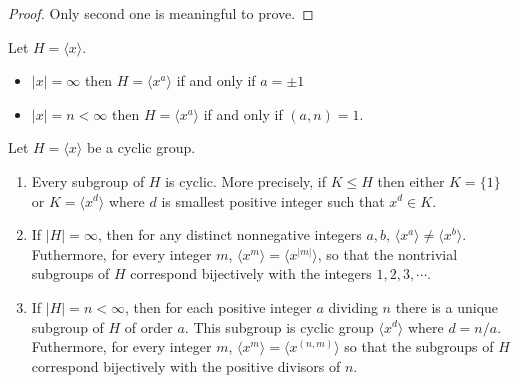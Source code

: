 \documentclass[12pt, a4paper, openany, twoside]{book}
\theoremstyle{definition}
\theoremstyle{remark}
\theoremstyle{plain}
\numberwithin{equation}{section}
\begin{document}
\begin{proof}
    
Only second one is meaningful to prove. 

\end{proof}

\begin{tcolorbox}[colback=yellow!10!white,colframe=green!75!black,title=Proposition]

Let $H = \langle x \rangle$. 
\begin{itemize}
    \item $|x| = \infty$ then $H = \langle x^a \rangle$ if and only if $a = \pm 1$
    \item $|x| = n < \infty$ then $H  = \langle x^a \rangle$ if and only if $(a, n) = 1$. 
\end{itemize}

\end{tcolorbox}

\begin{tcolorbox}[colback=yellow!10!white,colframe=red!75!black,title=Theorem]

Let $H = \langle x \rangle$ be a cyclic group. 

\begin{enumerate}
    \item Every subgroup of $H$ is cyclic. More precisely, if $K \leq H$ then either $K = \{1\}$ or $K = \langle x^d \rangle$ where $d$ is smallest positive integer such that $x^d \in K$. 
    \item If $|H| = \infty$, then for any distinct nonnegative integers $a, b$, $\langle x^a \rangle \neq \langle x^b \rangle$. Futhermore, for every integer $m$, $\langle x^m \rangle = \langle x^{|m|} \rangle$, so that the nontrivial subgroups of $H$ correspond bijectively with the integers $1, 2, 3, \cdots$. 
    \item If $|H| = n < \infty$, then for each positive integer $a$ dividing $n$ there is a unique subgroup of $H$ of order $a$. This subgroup is cyclic group $\langle x^d \rangle$ where $d = n / a$. Futhermore, for every integer $m$, $\langle x^m \rangle = \langle x^{(n, m)} \rangle$ so that the subgroups of $H$ correspond bijectively with the positive divisors of $n$. 
\end{enumerate}

\end{tcolorbox}
\end{document}
